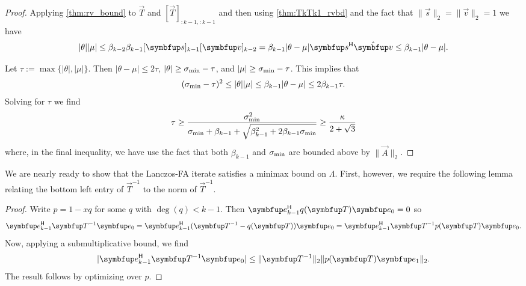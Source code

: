 \begin{proof}
Applying \cref{thm:rv_bound} to $\vec{T}$ and $[\vec{T}]_{:k-1,:k-1}$ and then using \cref{thm:TkTk1_rvbd} and the fact that $\|\vec{s}\|_2 = \|\vec{v}\|_2 = 1$ we have
\begin{equation*}
    |\theta||\mu| \leq \beta_{k-2}\beta_{k-1} [\vec{s}]_{k-1} [\vec{v}]_{k-2}
    = \beta_{k-1} |\theta - \mu| \vec{s}^\cT \hat{\vec{v}}
    \leq \beta_{k-1} |\theta - \mu|.
\end{equation*}

Let $\tau := \max\{|\theta|,|\mu|\}$. 
Then $|\theta-\mu|\leq 2\tau$, $|\theta| \geq \sigma_{\textup{min}}-\tau$,  and $|\mu| \geq \sigma_{\textup{min}}-\tau$.
This implies that
\begin{equation*}
    (\sigma_{\textup{min}} - \tau)^2
    \leq |\theta||\mu|
    \leq \beta_{k-1} | \theta - \mu |
    \leq 2 \beta_{k-1} \tau.
\end{equation*}
Solving for $\tau$ we find
\begin{equation*}
    \tau \geq \frac{\sigma_{\textup{min}}^2}{\sigma_{\textup{min}} + \beta_{k-1} + \sqrt{\beta_{k-1}^2 + 2\beta_{k-1} \sigma_{\textup{min}}}}
    \geq \frac{\kappa}{2+\sqrt{3}}
\end{equation*}
where, in the final inequality, we have use the fact that both $\beta_{k-1} $ and $\sigma_{\textup{min}}$ are bounded above by $\| \vec{A} \|_2$.
\end{proof}

We are nearly ready to show that the Lanczos-FA iterate satisfies a minimax bound on $\Lambda$. 
First, however, we require the following lemma relating the bottom left entry of \( \vec{T}^{-1} \) to the norm of \( \vec{T}^{-1} \).

\begin{proof}
Write $p = 1-xq$ for some $q$ with $\deg(q)<k-1$. 
Then $\vec{e}_{k-1}^\cT q(\vec{T}) \vec{e}_0 = 0$ so
\begin{equation*}
    \vec{e}_{k-1}^\cT\vec{T}^{-1} \vec{e}_0
    = \vec{e}_{k-1}^\cT(\vec{T}^{-1}-q(\vec{T})) \vec{e}_0
    = \vec{e}_{k-1}^\cT\vec{T}^{-1} p(\vec{T}) \vec{e}_0.
\end{equation*}
Now, applying a submultiplicative bound, we find
\begin{equation*}
    |\vec{e}_{k-1}^\cT\vec{T}^{-1} \vec{e}_0|
    \leq \| \vec{T}^{-1} \|_2 \| p(\vec{T}) \vec{e}_1 \|_2.
\end{equation*}
The result follows by optimizing over $p$.
\end{proof}

